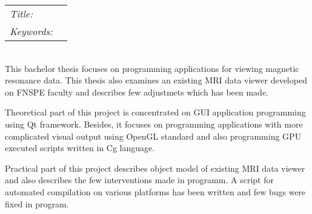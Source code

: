 \noindent
\begin{tabular}{ll}
	{\em Title:}	& \nazeven	\\[1mm]
	{\em Keywords:}	& \odstavec{\delka}{\keywords}	\\
\end{tabular}\\[5mm]
This bachelor thesis focuses on programming applications for viewing magnetic resonance data. This thesis also examines an existing MRI data viewer developed on FNSPE faculty and describes few adjustmets which has been made.

Theoretical part of this project is concentrated on GUI application programming using Qt framework. Besides, it focuses on programming applications with more complicated visual output using OpenGL standard and also programming GPU executed scripts written in Cg language.

Practical part of this project describes object model of existing MRI data viewer and also describes the few interventions made in programm. A script for automated compilation on various platforms has been written and few bugs were fixed in program.
